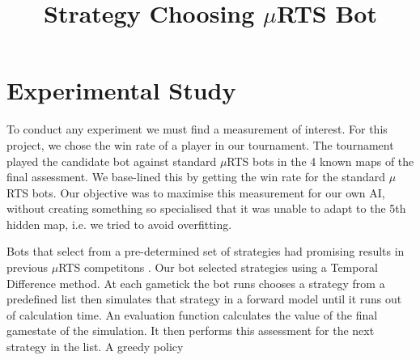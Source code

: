 \documentclass[]{article}
\title{Strategy Choosing $\mu$RTS Bot}
\author{}
\begin{document}
\maketitle

\begin{abstract}

\end{abstract}

\section{Experimental Study}
To conduct any experiment we must find a measurement of interest. For this project, we chose the win rate of a player in our tournament. The tournament played the candidate bot against standard $\mu$RTS bots in the 4 known maps of the final assessment. We base-lined this by getting the win rate for the standard $\mu$RTS bots. Our objective was to maximise this measurement for our own AI, without creating something so specialised that it was unable to adapt to the 5th hidden map, i.e. we tried to avoid overfitting. 

Bots that select from a pre-determined set of strategies had promising results in previous $\mu$RTS competitons \cite{firstcomp}. Our bot selected strategies using a Temporal Difference method. At each gametick the bot runs chooses a strategy from a predefined list then simulates that strategy in  a forward model until it runs out of calculation time. An evaluation function calculates the value of the final gamestate of the simulation. It then performs this assessment for the next strategy in the list. A greedy policy  
\todo



\end{document}

